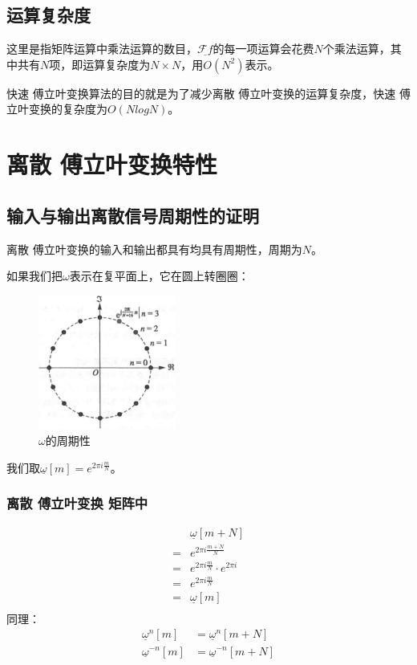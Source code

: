 \subsection{运算复杂度}
这里是指矩阵运算中乘法运算的数目，$\underline{\mathcal{F}f}$的每一项运算会花费$N$个乘法运算，其中共有$N$项，即运算复杂度为$N\times N$，用$O(N^2)$表示。

快速 傅立叶变换算法的目的就是为了减少离散 傅立叶变换的运算复杂度，快速 傅立叶变换的复杂度为$O(NlogN)$。
\section{离散 傅立叶变换特性}
\subsection{输入与输出离散信号周期性的证明}
离散 傅立叶变换的输入和输出都具有均具有周期性，周期为$N$。

如果我们把$\omega$表示在复平面上，它在圆上转圈圈：
\begin{figure}[H]
	\centering
	\includegraphics[width=0.4\textwidth]{assets/omega.png}
	\caption{$\omega$的周期性}
\end{figure}

我们取$\underline{\omega}[m] =e^{2\pi i \frac{m}{N}} $。
\subsubsection{离散 傅立叶变换 矩阵中}
\begin{align*}
	  & \underline{\omega}[m+N]               \\
	= & e^{2\pi i\frac{m+N}{N}}               \\
	= & e^{2\pi i\frac{m}{N}}\cdot e^{2\pi i} \\
	= & e^{2\pi i\frac{m}{N}}                 \\
	= & \underline{\omega}[m]                 \\
\end{align*}
同理：
\begin{align*}
	\underline{\omega}^{n}[m]  & = \underline{\omega}^n[m+N]    \\
	\underline{\omega}^{-n}[m] & = \underline{\omega}^{-n}[m+N]
\end{align*}

